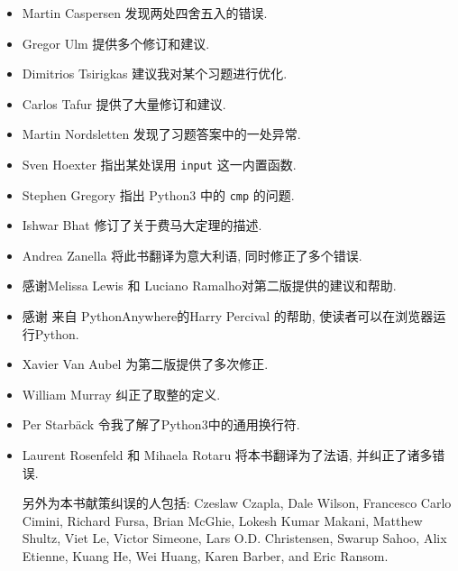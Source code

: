\documentclass[10pt]{book}
\begin{document}
\begin{itemize}
\item Martin Caspersen 发现两处四舍五入的错误. 

\item Gregor Ulm 提供多个修订和建议. 

\item Dimitrios Tsirigkas 建议我对某个习题进行优化. 

\item Carlos Tafur 提供了大量修订和建议. 

\item Martin Nordsletten 发现了习题答案中的一处异常. 

\item Sven Hoexter 指出某处误用 {\tt input} 这一内置函数. 

\item Stephen Gregory 指出 Python3 中的 {\tt cmp} 的问题. 

\item Ishwar Bhat 修订了关于费马大定理的描述. 

\item Andrea Zanella 将此书翻译为意大利语, 同时修正了多个错误. 


\item 感谢Melissa Lewis 和 Luciano Ramalho对第二版提供的建议和帮助. 

\item 感谢 来自 PythonAnywhere的Harry Percival 的帮助, 使读者可以在浏览器运行Python. 

\item Xavier Van Aubel 为第二版提供了多次修正. 

\item William Murray 纠正了取整的定义. 

\item Per Starb{\"a}ck 令我了解了Python3中的通用换行符. 

\item Laurent Rosenfeld 和 Mihaela Rotaru 将本书翻译为了法语, 并纠正了诸多错误. 


另外为本书献策纠误的人包括: 
Czeslaw Czapla, Dale Wilson, Francesco Carlo Cimini,
Richard Fursa, Brian McGhie, Lokesh Kumar Makani, Matthew Shultz, Viet
Le, Victor Simeone, Lars O.D. Christensen, Swarup Sahoo, Alix Etienne,
Kuang He, Wei Huang, Karen Barber, and Eric Ransom. 



\end{itemize}

\normalsize
\clearemptydoublepage
\end{document}
